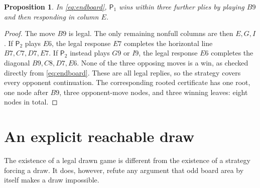 \documentclass[11pt]{article}
\newtheorem{proposition}[theorem]{Proposition}
\theoremstyle{definition}
\theoremstyle{remark}
\newcommand{\Pone}{\mathsf{P}_1}
\newcommand{\Ptwo}{\mathsf{P}_2}
\begin{document}
\begin{proposition}\label{prop:endgame}
In \eqref{eq:endboard}, $\Pone$ wins within three further plies by playing
$B9$ and then responding in column $E$.
\end{proposition}
\begin{proof}
The move $B9$ is legal. The only remaining nonfull columns are then
$E,G,I$. If $\Ptwo$ plays $E6$, the legal response $E7$ completes the
horizontal line $B7,C7,D7,E7$. If $\Ptwo$ instead plays $G9$ or $I9$,
the legal response $E6$ completes the diagonal $B9,C8,D7,E6$.
None of the three opposing moves is a win, as checked directly from
\eqref{eq:endboard}. These are all legal replies, so the strategy covers
every opponent continuation. The corresponding rooted certificate has
one root, one node after $B9$, three opponent-move nodes, and three winning
leaves: eight nodes in total.
\end{proof}

\section{An explicit reachable draw}\label{sec:draw}
The existence of a legal drawn game is different from the existence of a
strategy forcing a draw. It does, however, refute any argument that odd
board area by itself makes a draw impossible.
\end{document}
